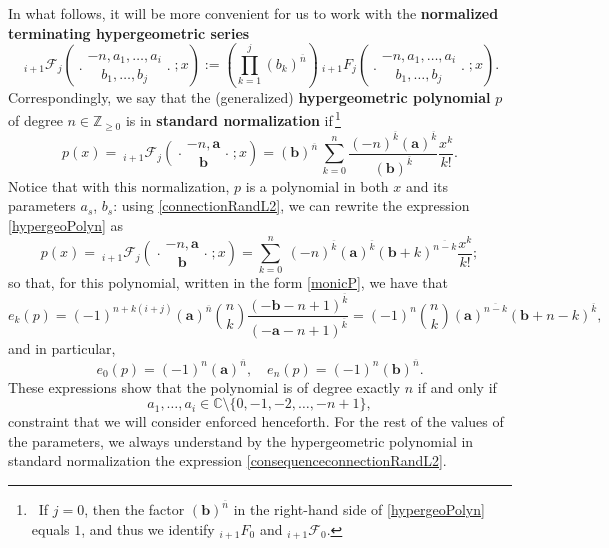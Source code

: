 \documentclass[reqno,11pt]{amsart}
\theoremstyle{remark}
\newcommand{\C}{\mathbb{C}}
\newcommand{\raising}[2]{\left(#1\right)^{\overline{#2}}}
\newcommand*\pFq[5]{%
 {\ }_{#1}{\mathcal F}_{#2}{\left(\genfrac..{0pt}{}{#3}{#4};#5\right)}%
}
\newcommand*\HGF[5]{%
 {\ }_{#1} F_{#2}{\left(\genfrac..{0pt}{}{#3}{#4};#5\right)}%
}
\begin{document}
In what follows, it will be more convenient for us to work with the \textbf{normalized terminating hypergeometric series}
\begin{equation} \label{hypergeoSeriesNormalized}
\pFq{i+1}{j}{-n, a_1, \dots, a_i}{b_1, \dots, b_j}{x}:= \left( \prod_{k=1}^j \raising{b_k}{n}\right) \HGF{i+1}{j}{-n, a_1, \dots, a_i}{b_1, \dots, b_j}{x}.
\end{equation}
Correspondingly, we say that the  (generalized) \textbf{hypergeometric polynomial} $p$ of degree $n\in \mathbb Z_{\ge 0} $ is in \textbf{standard normalization} if\,\footnote{\, If $j=0$, then the factor $\raising{\bm b}{n}$ in the right-hand side of \eqref{hypergeoPolyn} equals $1$, and thus we identify $_{i+1}F_0$ and $_{i+1}\mathcal F_0$.}
\begin{equation} \label{hypergeoPolyn}
p(x)=\pFq{i+1}{j}{-n, \bm a}{\bm b }{x} = \raising{\bm b}{n} \, \sum_{k=0}^n \frac{\raising{-n}{k} \raising{\bm a}{k}}{\raising{\bm b}{k}} \frac{x^k}{k !}.
\end{equation}
Notice that with this normalization, $p$   is a polynomial in both $x$ and its parameters $a_s$, $b_s$: using \eqref{connectionRandL2}, we can rewrite the expression \eqref{hypergeoPolyn} as 
\begin{equation}
    \label{consequenceconnectionRandL2}
      p(x)=\pFq{i+1}{j}{-n, \bm a}{\bm b }{x} =   \sum_{k=0}^n \ \raising{-n}{k} \raising{\bm a}{k} \raising{\bm b+k}{n-k} \frac{x^k}{k !};
\end{equation}
so that, for this polynomial, written in the form \eqref{monicP}, we have that 
\begin{equation} \label{leadingcoeffHGFBis}
    e_k(p)=(-1)^{n+k(i+j)}  \raising{\bm a}{n} \binom{n}{k} \frac{\raising{-\bm b-n+1}{k}}{\raising{-\bm a-n+1}{k}} =(-1)^{n }   \binom{n}{k}
    \raising{\bm a}{n-k} \raising{\bm b+n-k}{k},   
\end{equation}
and in particular,
\begin{equation} \label{leadingcoeffHGF}
    e_0(p)=(-1)^n  \raising{\bm a}{n} , \quad e_n(p)=(-1)^n  \raising{\bm b}{n}.
\end{equation}
These expressions show that the polynomial is of degree exactly  $n$ if and only if
\begin{equation}\label{assumptionsHGFNew}
  a_1,\dots, a_i   \in \C \setminus \{0, -1,-2,\dots, -n+1  \},
\end{equation}
constraint that we will consider enforced henceforth. For the rest of the values of the parameters, we always understand by the hypergeometric polynomial in standard normalization the expression \eqref{consequenceconnectionRandL2}. 
\end{document}
